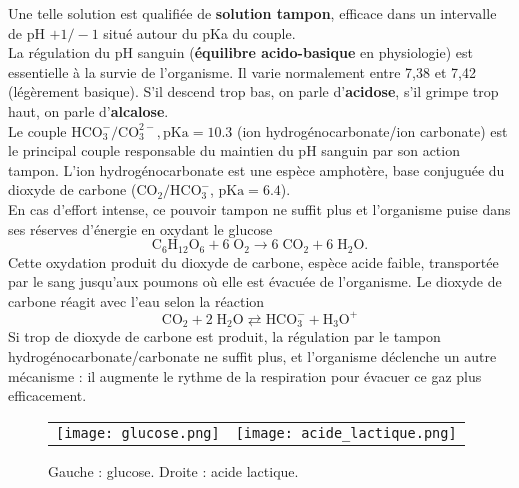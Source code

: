 \documentclass[11pt,a4paper]{report}
\begin{document}
Une telle solution est qualifiée de \textbf{solution tampon}, efficace dans un intervalle de pH $+1/-1$ situé autour du pKa du couple.\\

La régulation du pH sanguin (\textbf{équilibre acido-basique} en physiologie) est essentielle à la survie de l'organisme. Il varie normalement entre 7,38 et 7,42 (légèrement basique). S'il descend trop bas, on parle d'\textbf{acidose}, s'il grimpe trop haut, on parle d'\textbf{alcalose}.\\

Le couple $\text{HCO}_3^-/\text{CO}_3^{2-}, \text{pKa} = 10.3$ (ion hydrogénocarbonate/ion carbonate) est le principal couple responsable du maintien du pH sanguin par son action tampon. L'ion hydrogénocarbonate est une espèce amphotère, base conjuguée du dioxyde de carbone ($\text{CO}_2/\text{HCO}_3^-$, $\text{pKa} = 6.4$).\\

En cas d'effort intense, ce pouvoir tampon ne suffit plus et l'organisme puise dans ses réserves d'énergie en oxydant le glucose
\begin{equation}
	\text{C}_6\text{H}_{12}\text{O}_6 + 6\;\text{O}_{2} 
	\rightarrow 6\;\text{CO}_{2} + 6\;\text{H}_2\text{O}.
\end{equation}	
Cette oxydation produit du dioxyde de carbone, espèce acide faible, transportée par le sang jusqu'aux poumons où elle est évacuée de l'organisme. Le dioxyde de carbone réagit avec l'eau selon la réaction
\begin{equation}
	\text{CO}_{2} + 2\;\text{H}_2\text{O} \rightleftarrows
	\text{HCO}_3^- + \text{H}_3\text{O}^+
\end{equation}
Si trop de dioxyde de carbone est produit, la régulation par le tampon hydrogénocarbonate/carbonate ne suffit plus, et l'organisme déclenche un autre mécanisme : il augmente le rythme de la respiration pour évacuer ce gaz plus efficacement.\\

\begin{figure}[h!]
	\begin{center}
		\begin{tabular}{cc}
  		\texttt{[image: glucose.png]} &
   		\texttt{[image: acide\_lactique.png]}\\
	\end{tabular}
	\caption{Gauche : glucose. Droite : acide lactique.}
	\end{center}
\end{figure}
\end{document}
